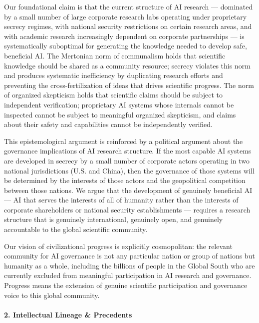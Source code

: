 Our foundational claim is that the current structure of AI research ---
dominated by a small number of large corporate research labs operating
under proprietary secrecy regimes, with national security restrictions
on certain research areas, and with academic research increasingly
dependent on corporate partnerships --- is systematically suboptimal for
generating the knowledge needed to develop safe, beneficial AI. The
Mertonian norm of communalism holds that scientific knowledge should be
shared as a community resource; secrecy violates this norm and produces
systematic inefficiency by duplicating research efforts and preventing
the cross-fertilization of ideas that drives scientific progress. The
norm of organized skepticism holds that scientific claims should be
subject to independent verification; proprietary AI systems whose
internals cannot be inspected cannot be subject to meaningful organized
skepticism, and claims about their safety and capabilities cannot be
independently verified.

This epistemological argument is reinforced by a political argument
about the governance implications of AI research structure. If the most
capable AI systems are developed in secrecy by a small number of
corporate actors operating in two national jurisdictions (U.S. and
China), then the governance of those systems will be determined by the
interests of those actors and the geopolitical competition between those
nations. We argue that the development of genuinely beneficial AI --- AI
that serves the interests of all of humanity rather than the interests
of corporate shareholders or national security establishments ---
requires a research structure that is genuinely international, genuinely
open, and genuinely accountable to the global scientific community.

Our vision of civilizational progress is explicitly cosmopolitan: the
relevant community for AI governance is not any particular nation or
group of nations but humanity as a whole, including the billions of
people in the Global South who are currently excluded from meaningful
participation in AI research and governance. Progress means the
extension of genuine scientific participation and governance voice to
this global community.

\paragraph{2. Intellectual Lineage \&
Precedents}\label{intellectual-lineage-precedents-27}


